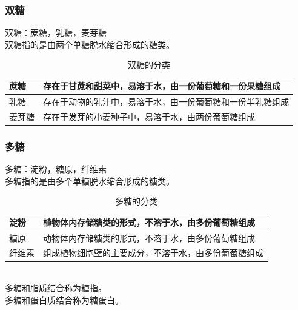 \documentclass[UTF8]{ctexart}
\begin{document}
\subsubsection{双糖}
    双糖：蔗糖，乳糖，麦芽糖\\[2mm]
    双糖指的是由两个单糖脱水缩合形成的糖类。\vspace{10pt}
    \begin{table}[h]
        \begin{center}
            \begin{tabular}{l|l}
                \hline
                蔗糖\qquad\qquad&存在于甘蔗和甜菜中，易溶于水，由一份葡萄糖和一份果糖组成\qquad\qquad\\ \hline
                乳糖\qquad\qquad&存在于动物的乳汁中，易溶于水，由一份葡萄糖和一份半乳糖组成\qquad\qquad\\ \hline
                麦芽糖\qquad\qquad&存在于发芽的小麦种子中，易溶于水，由两份葡萄糖组成\\ \hline
            \end{tabular}
            \caption{双糖的分类}
        \end{center}
    \end{table}\vspace{-5pt}

\subsubsection{多糖}
    多糖：淀粉，糖原，纤维素\\[2mm]
    多糖指的是由多个单糖脱水缩合形成的糖类。\vspace{10pt}
    \begin{table}[h]
        \begin{center}
            \begin{tabular}{l|l}
                \hline
                淀粉\qquad\qquad&植物体内存储糖类的形式，不溶于水，由多份葡萄糖组成\qquad\qquad\\ \hline
                糖原\qquad\qquad&动物体内存储糖类的形式，不溶于水，由多份葡萄糖组成\qquad\qquad\\ \hline
                纤维素\qquad\qquad&组成植物细胞壁的主要成分，不溶于水，由多份葡萄糖组成\\ \hline
            \end{tabular}
            \caption{多糖的分类}
        \end{center}
    \end{table}\\
多糖和脂质结合称为糖指。\\[3mm]
多糖和蛋白质结合称为糖蛋白。
\end{document}
